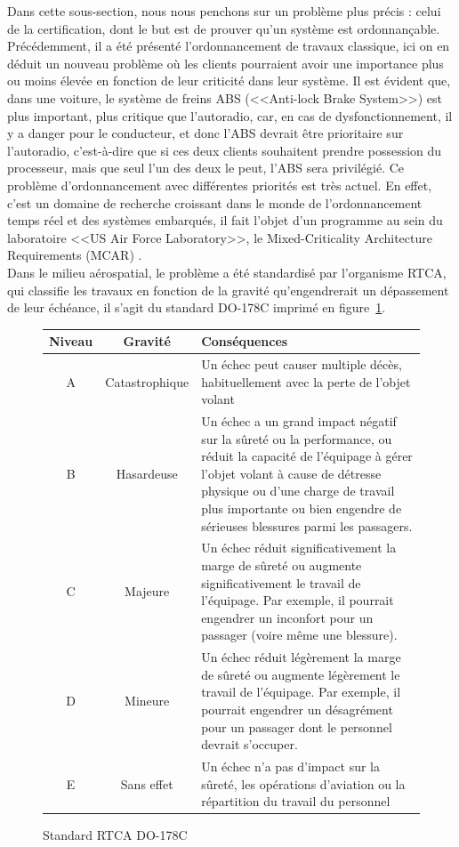 \documentclass[11pt,a4paper,oneside]{book}
\theoremstyle{break}
\theoremstyle{breakplain}
\begin{document}
Dans cette sous-section, nous nous penchons sur un problème plus précis : celui de la certification, dont le but est de prouver qu'un système est ordonnançable.\\

Précédemment, il a été présenté l'ordonnancement de travaux classique, ici on en déduit un nouveau problème où les clients pourraient avoir une importance plus ou moins élevée en fonction de leur criticité dans leur système. 
Il est évident que, dans une voiture, le système de freins ABS (<<Anti-lock Brake System>>) est plus important, plus critique que l'autoradio, car, en cas de dysfonctionnement, il y a danger pour le conducteur, et donc l'ABS devrait être prioritaire sur l'autoradio, c'est-à-dire que si ces deux clients souhaitent prendre possession du processeur, mais que seul l'un des deux le peut, l'ABS sera privilégié. Ce problème d'ordonnancement avec différentes priorités est très actuel. En effet, c'est un domaine de recherche croissant dans le monde de l'ordonnancement temps réel et des systèmes embarqués, il fait l'objet d'un programme au sein du laboratoire <<US Air Force Laboratory>>, le Mixed-Criticality Architecture Requirements (MCAR) \cite{de2009scheduling}.\\

Dans le milieu aérospatial, le problème a été standardisé par l'organisme RTCA, qui classifie les travaux en fonction de la gravité qu'engendrerait un dépassement de leur échéance, il s'agit du standard DO-178C imprimé en figure~\ref{do178}.\\
\begin{figure}[h]
\begin{tabularx}{\textwidth}{|c|c|X|}
\hline
Niveau & Gravité & Conséquences\\
\hline
A & Catastrophique & Un échec peut causer multiple décès, habituellement avec la perte de l'objet volant\\
\hline
B & Hasardeuse & Un échec a un grand impact négatif sur la sûreté ou la performance, ou réduit la capacité de l'équipage à gérer l'objet volant à cause de détresse physique ou d'une charge de travail plus importante ou bien engendre de sérieuses blessures parmi les passagers.\\
\hline
C & Majeure & Un échec réduit significativement la marge de sûreté ou augmente significativement le travail de l'équipage. Par exemple, il pourrait engendrer un inconfort pour un passager (voire même une blessure).\\
\hline
D & Mineure & Un échec réduit légèrement la marge de sûreté ou augmente légèrement le travail de l'équipage. Par exemple, il pourrait engendrer un désagrément pour un passager dont le personnel devrait s'occuper.\\
\hline
E & Sans effet & Un échec n'a pas d'impact sur la sûreté, les opérations d'aviation ou la répartition du travail du personnel\\
\hline
\end{tabularx}
\caption{Standard RTCA DO-178C \cite{nordhoff2012do178}}
\label{do178}
\end{figure}
\end{document}
